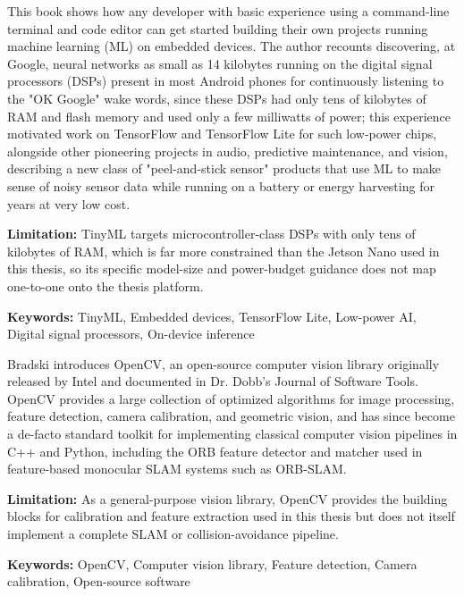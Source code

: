 {
	This book \cite{Warden:2020} shows how any developer with basic experience using a command-line terminal and code editor can get started building their own projects running machine learning (ML) on embedded devices. The author recounts discovering, at Google, neural networks as small as 14 kilobytes running on the digital signal processors (DSPs) present in most Android phones for continuously listening to the "OK Google" wake words, since these DSPs had only tens of kilobytes of RAM and flash memory and used only a few milliwatts of power; this experience motivated work on TensorFlow and TensorFlow Lite for such low-power chips, alongside other pioneering projects in audio, predictive maintenance, and vision, describing a new class of "peel-and-stick sensor" products that use ML to make sense of noisy sensor data while running on a battery or energy harvesting for years at very low cost.
	
	\bigskip
	\textbf{Limitation:} TinyML targets microcontroller-class DSPs with only tens of kilobytes of RAM, which is far more constrained than the Jetson Nano used in this thesis, so its specific model-size and power-budget guidance does not map one-to-one onto the thesis platform.
	
	\scriptsize{\textbf{Keywords:} TinyML, Embedded devices, TensorFlow Lite, Low-power AI, Digital signal processors, On-device inference}
}








{
	Bradski \cite{Bradski:2000} introduces OpenCV, an open-source computer vision library originally released by Intel and documented in Dr. Dobb's Journal of Software Tools. OpenCV provides a large collection of optimized algorithms for image processing, feature detection, camera calibration, and geometric vision, and has since become a de-facto standard toolkit for implementing classical computer vision pipelines in C++ and Python, including the ORB feature detector and matcher used in feature-based monocular SLAM systems such as ORB-SLAM.
	
	\bigskip
	\textbf{Limitation:} As a general-purpose vision library, OpenCV provides the building blocks for calibration and feature extraction used in this thesis but does not itself implement a complete SLAM or collision-avoidance pipeline.
	
	\scriptsize{\textbf{Keywords:} OpenCV, Computer vision library, Feature detection, Camera calibration, Open-source software}
}

